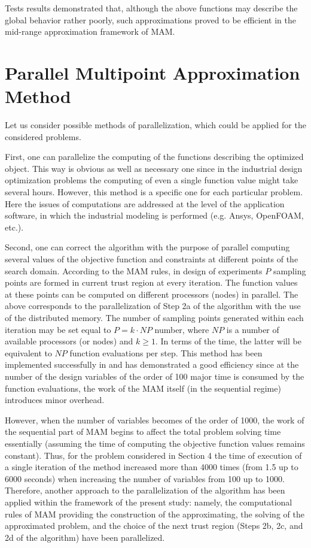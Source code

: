 \documentclass[runningheads,a4paper]{llncs}
\begin{document}
Tests results demonstrated that, although the above functions may describe the global behavior rather poorly, such approximations proved to be efficient in the mid-range approximation framework of MAM.

\section{Parallel Multipoint Approximation Method}\label{sec:par_alg}

Let us consider possible methods of parallelization, which could be applied for the considered problems.

First, one can parallelize the computing of the functions describing the optimized object. This way is obvious as well as necessary one since in the industrial design optimization problems the computing of even a single function value might take several hours. However, this method is a specific one for each particular problem. Here the issues of computations are addressed at the level of the application software, in which the industrial modeling is performed (e.g. Ansys, OpenFOAM, etc.).

Second, one can correct the algorithm with the purpose of parallel computing several values of the objective function and constraints at different points of the search domain. According to the MAM rules, in design of experiments $P$ 
sampling points are formed in current trust region at every iteration. The function values at these points can be computed on different processors (nodes) in parallel. The above corresponds to the parallelization of Step 2a of the algorithm with the use of the distributed memory. The number of sampling points generated within each iteration may be set equal to $P = k\cdot NP$ number, where $NP$ is a number of available processors (or nodes) and $k \geq 1$. In  terms of the time, the latter will be equivalent to $NP$ function evaluations per step. This method has been implemented successfully in \cite{PolynkinToropov2008} and has demonstrated a good efficiency since at the number of the design variables of the order of 100 major time is consumed by the function evaluations, the work of the MAM itself (in the sequential regime) introduces minor overhead.

However, when the number of variables becomes of the order of 1000, the work of the sequential part of MAM begins to affect the total problem solving time essentially (assuming the time of computing the objective function 
values remains constant). Thus, for the problem considered in Section 4 the time of execution of a single iteration of the method increased more than 4000 times (from 1.5 up to 6000 seconds) when increasing the number of variables from 100 up to  1000. Therefore, another approach to the parallelization of the algorithm has been applied within the framework of the 
present study: namely, the computational rules of MAM  providing the construction of the approximating, the solving of the approximated problem, and the choice of the next trust region (Steps 2b, 2c, and 2d of the algorithm) have been parallelized.
\end{document}
